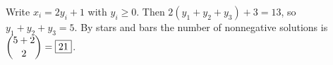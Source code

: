 Write $x_i=2y_i+1$ with $y_i\ge0$. Then $2(y_1+y_2+y_3)+3=13$, so $y_1+y_2+y_3=5$. By stars and bars the number of nonnegative solutions is $\dbinom{5+2}{2}=\boxed{21}$.
